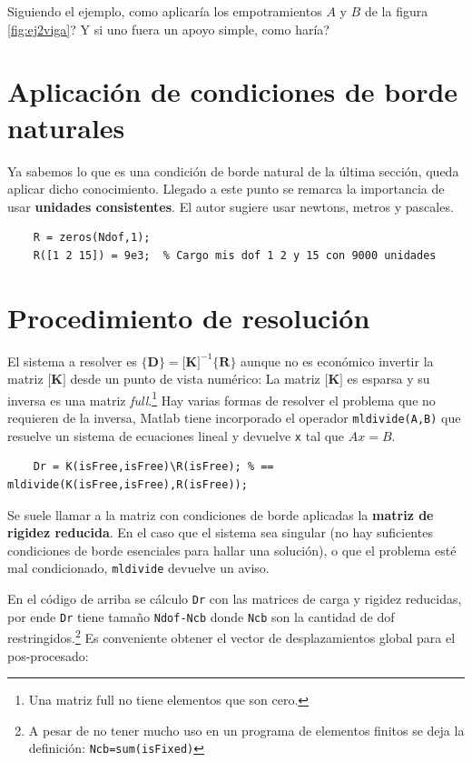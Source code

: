 \documentclass[11pt, a4paper,titlepage]{article}
\newcommand{\rmfont}[1]{{\fontfamily{ptm}\selectfont%
#1}}
\newcommand{\Matlab}{\rmfont{\sc Matlab}}
\newcommand{\Mme}[1]{\boldsymbol{[}\mathbf{#1} \boldsymbol{]}}
\newcommand{\Cme}[1]{\boldsymbol{\{ }\mathbf{#1} \boldsymbol{\}} }
\newcommand{\CD}{\Cme{D}}
\newcommand{\MK}{\Mme{K}}
\newcommand{\CR}{\Cme{R}}
\begin{document}
Siguiendo el ejemplo, como aplicaría los empotramientos $A$ y $B$ de la figura \ref{fig:ej2viga}? Y si uno fuera un apoyo simple, como haría?



\section{Aplicación de condiciones de borde naturales}
Ya sabemos lo que es una condición de borde natural de la última sección, queda aplicar dicho conocimiento. Llegado a este punto se remarca la importancia de usar \textbf{unidades consistentes}. El autor sugiere usar newtons, metros y pascales.  

\begin{verbatim}
    R = zeros(Ndof,1);
    R([1 2 15]) = 9e3;  % Cargo mis dof 1 2 y 15 con 9000 unidades
\end{verbatim}



\section{Procedimiento de resolución}
El sistema a resolver es $\CD=\MK^{-1}\CR$ aunque no es económico invertir la matriz $\MK$ desde un punto de vista numérico: La matriz $\MK$ es esparsa y su inversa es una matriz \textit{full}.\footnote{Una matriz full no tiene elementos que son cero.} Hay varias formas de resolver el problema que no requieren de la inversa, \Matlab{} tiene incorporado el operador \texttt{mldivide(A,B)} que resuelve un sistema de ecuaciones lineal y devuelve \texttt{x} tal que $Ax=B$. 

\begin{verbatim}
    Dr = K(isFree,isFree)\R(isFree); % == mldivide(K(isFree,isFree),R(isFree));
\end{verbatim}
Se suele llamar a la matriz con condiciones de borde aplicadas la \textbf{matriz de rigidez reducida}. En el caso que el sistema sea singular (no hay suficientes condiciones de borde esenciales para hallar una solución), o que el problema esté mal condicionado, \texttt{mldivide} devuelve un aviso.  

En el código de arriba se cálculo \texttt{Dr} con las matrices de carga y rigidez reducidas, por ende \texttt{Dr} tiene tamaño \texttt{Ndof-Ncb} donde \texttt{Ncb} son la cantidad de dof restringidos.\footnote{A pesar de no tener mucho uso en un programa de elementos finitos se deja la definición: \texttt{Ncb=sum(isFixed)}} Es conveniente obtener el vector de desplazamientos global para el pos-procesado:
\end{document}
